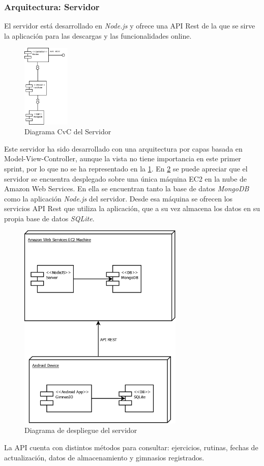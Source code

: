 \documentclass[11pt,a4paper]{report}
\begin{document}
\subsubsection{Arquitectura: Servidor}
El servidor está desarrollado en \textit{Node.js} y ofrece una API Rest de la que se sirve la aplicación para las descargas y las funcionalidades online. 
\begin{figure}[H]
	\centering
	\includegraphics[width=0.2\textwidth]{capturicas/CvCSer.png}
	\caption{Diagrama CvC del Servidor}
	\label{fig: CvCSer}
\end{figure}
Este servidor ha sido desarrollado con una arquitectura por capas basada en Model-View-Controller, aunque la vista no tiene importancia en este primer sprint, por lo que no se ha representado en la \ref{fig: CvCSer}. En \ref{fig: depSer} se puede apreciar que el servidor se encuentra desplegado sobre una única máquina EC2 en la nube de Amazon Web Services. En ella se encuentran tanto la base de datos \textit{MongoDB} como la aplicación \textit{Node.js} del servidor. Desde esa máquina se ofrecen los servicios API Rest que utiliza la aplicación, que a su vez almacena los datos en su propia base de datos \textit{SQLite}.
\begin{figure}[H]
	\centering
	\includegraphics[width=0.7\textwidth]{capturicas/depSer.png}
	\caption{Diagrama de despliegue del servidor}
	\label{fig: depSer}
\end{figure}
La API cuenta con distintos métodos para consultar: ejercicios, rutinas, fechas de actualización, datos de almacenamiento y gimnasios registrados.
\end{document}
